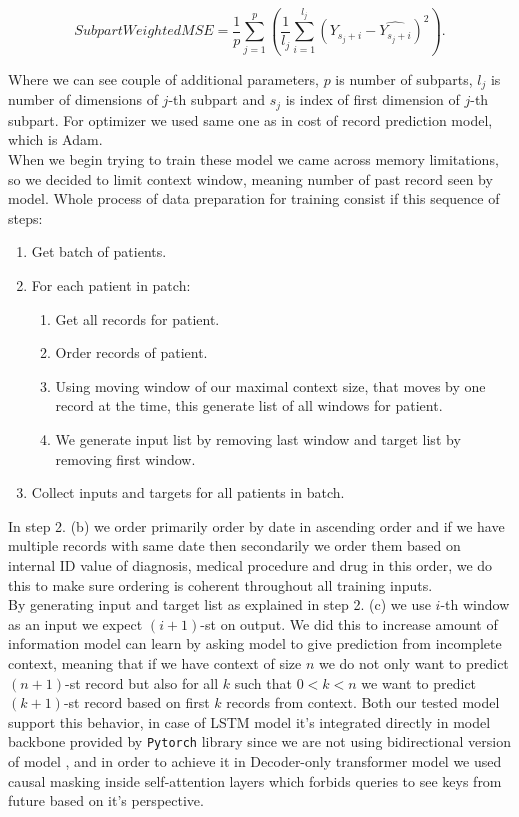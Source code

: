 \begin{equation}
	\label{eqn:swmse}
	SubpartWeightedMSE = \frac{1}{p} \sum_{j=1}^{p}(\frac{1}{l_j}\sum_{i=1}^{l_j}(Y_{s_j+i}-\hat{Y_{s_j+i}})^2).
\end{equation} 

Where we can see couple of additional parameters, $p$ is number of subparts, $l_j$ is number of dimensions of $j$-th subpart and $s_j$ is index of first dimension of $j$-th subpart. For optimizer we used same one as in cost of record prediction model, which is Adam.
\\

When we begin trying to train these model we came across memory limitations, so we decided to limit context window, meaning number of past record seen by model. Whole process of data preparation for training consist if this sequence of steps:

\begin{enumerate}
	\item Get batch of patients.
	\item For each patient in patch:
	\begin{enumerate}
		\item Get all records for patient.
		\item Order records of patient.
		\item Using moving window of our maximal context size, that moves by one record at the time, this generate list of all windows for patient.
		\item We generate input list by removing last window and target list by removing first window.
	\end{enumerate}
	\item Collect inputs and targets for all patients in batch.
\end{enumerate}

In step 2. (b) we order primarily order by date in ascending order and if we have multiple records with same date then secondarily we order them based on internal ID value of diagnosis, medical procedure and drug in this order, we do this to make sure ordering is coherent throughout all training inputs.
\\ 

By generating input and target list as explained in step 2. (c) we use $i$-th window as an input we expect $(i+1)$-st on output. We did this to increase amount of information model can learn by asking model to give prediction from incomplete context, meaning that if we have context of size $n$ we do not only want to predict $(n+1)$-st record but also for all $k$ such that $0<k<n$ we want to predict $(k+1)$-st record based on first $k$ records from context. Both our tested model support this behavior, in case of LSTM model it's integrated directly in model backbone provided by \texttt{Pytorch} library since we are not using bidirectional version of model \cite{pytorchLSTM}, and in order to achieve it in Decoder-only transformer model we used causal masking inside self-attention layers which forbids queries to see keys from future based on it's perspective.
\\

